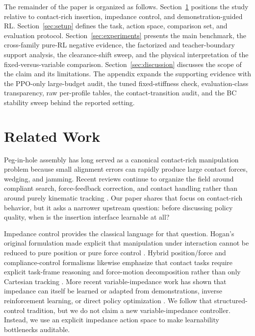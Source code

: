 ﻿\documentclass[11pt]{article}
\begin{document}
The remainder of the paper is organized as follows. Section~\ref{sec:related-work} positions the
study relative to contact-rich insertion, impedance control, and demonstration-guided RL.
Section~\ref{sec:setup} defines the task, action space, comparison set, and evaluation protocol.
Section~\ref{sec:experiments} presents the main benchmark, the cross-family pure-RL negative
evidence, the factorized and teacher-boundary support analysis, the clearance-shift sweep, and the
physical interpretation of the fixed-versus-variable comparison. Section~\ref{sec:discussion}
discusses the scope of the claim and its limitations. The appendix expands the supporting evidence
with the PPO-only large-budget audit, the tuned fixed-stiffness check, evaluation-class
transparency, raw per-profile tables, the contact-transition audit, and the BC stability sweep
behind the reported setting.

\section{Related Work}
\label{sec:related-work}

Peg-in-hole assembly has long served as a canonical contact-rich manipulation problem because small
alignment errors can rapidly produce large contact forces, wedging, and jamming. Recent reviews
continue to organize the field around compliant search, force-feedback correction, and contact
handling rather than around purely kinematic tracking \citep{li2025_peg_review}. Our paper shares
that focus on contact-rich behavior, but it asks a narrower upstream question: before discussing
policy quality, when is the insertion interface learnable at all?

Impedance control provides the classical language for that question. Hogan's original formulation
made explicit that manipulation under interaction cannot be reduced to pure position or pure force
control \citep{hogan1985_impedance_part1,hogan1985_impedance_part2}. Hybrid position/force and
compliance-control formalisms likewise emphasize that contact tasks require explicit task-frame
reasoning and force-motion decomposition rather than only Cartesian tracking
\citep{mason1981_compliance_force,raibert1981_hybrid_position_force}. More recent variable-impedance
work has shown that impedance can itself be learned or adapted from demonstrations, inverse
reinforcement learning, or direct policy optimization
\citep{abudakka2020_variable_impedance_demo,zhang2021_variable_impedance_irl,
zhang2023_variable_impedance_passivity,zhou2024_mobile_manipulator_imitation,
yang2025_variable_impedance_passivity}. We follow that structured-control tradition, but we do not
claim a new variable-impedance controller. Instead, we use an explicit impedance action space to
make learnability bottlenecks auditable.
\end{document}
